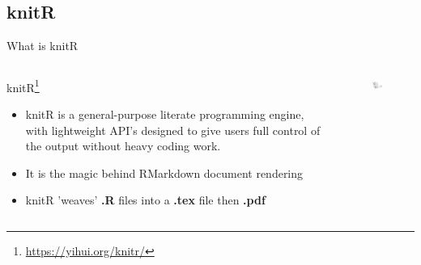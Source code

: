 \documentclass[fleqn]{beamer}\usepackage[]{graphicx}\usepackage[]{color}
\begin{document}
\subsection{knitR}
\begin{frame}{What is knitR}
\begin{columns}[T] %
\begin{column}{.48\textwidth}
knitR\footnote{\href{https://yihui.org/knitr/}{https://yihui.org/knitr/}}
\begin{itemize}
  \item knitR is a general-purpose literate programming engine, with lightweight API's designed to give users full control of the output without heavy coding work.
  \item It is the magic behind RMarkdown document rendering
  \item knitR 'weaves' \textbf{.R} files into a \textbf{.tex} file then \textbf{.pdf}
\end{itemize}
\end{column}%
\hfill%
\begin{column}{.48\textwidth}
\begin{figure}[htp]
    \centering
    \includegraphics[width=4cm]{images/knit-logo}
\end{figure}
\end{column}%
\end{columns}
\end{frame}
\end{document}
